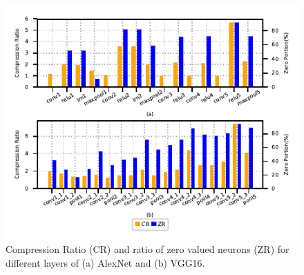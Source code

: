 \begin{figure}[h]
\centering
\includegraphics[width=\linewidth]{alexnet_vgg_compression}
\caption{Compression Ratio (CR) and ratio of zero valued neurons (ZR) for different layers of (a) AlexNet and (b) VGG16.}
\label{fig:picCR_VGG}
\end{figure}


